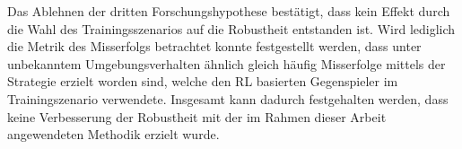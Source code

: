 Das Ablehnen der dritten Forschungshypothese bestätigt, dass kein Effekt durch die Wahl des Trainingsszenarios auf die Robustheit entstanden ist.
Wird lediglich die Metrik des Misserfolgs betrachtet konnte festgestellt werden, dass unter unbekanntem Umgebungsverhalten ähnlich gleich häufig Misserfolge mittels der Strategie erzielt worden sind, welche den RL basierten Gegenspieler im Trainingszenario verwendete.
Insgesamt kann dadurch festgehalten werden, dass keine Verbesserung der Robustheit mit der im Rahmen dieser Arbeit angewendeten Methodik erzielt wurde.
